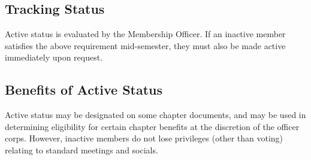 \subsection{Tracking Status} \label{VIII.3}

Active status is evaluated by the Membership Officer.
If an inactive member satisfies the above requirement mid-semester, they must also be
made active immediately upon request.


\subsection{Benefits of Active Status} \label{VIII.4}

Active status may be designated on some
chapter documents, and may be used in determining eligibility for certain chapter benefits
at the discretion of the officer corps. However, inactive members do not lose privileges
(other than voting) relating to standard meetings and socials.